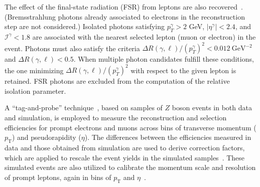 The effect of the final-state radiation (FSR) from leptons are also recovered~\cite{Sirunyan:2017ulk}. (Bremsstrahlung photons already associated to electrons in the reconstruction step are not considered.) Isolated photons satisfying $p_T^\gamma>2$ GeV, $|\eta^\gamma| <2.4$, and $\mathcal{I}^{\gamma} < 1.8$ are associated with the nearest selected lepton (muon or electron) in the event. Photons must also satisfy the criteria $\Delta R(\gamma,\ell)/(p_T^{\gamma})^2<0.012~\text{GeV}^{-2}$ and $\Delta R(\gamma,\ell) < 0.5$. When multiple photon candidates fulfill these conditions, the one minimizing $\Delta R(\gamma,\ell)/(p_T^{\gamma})^2$ with respect to the given lepton is retained. FSR photons are excluded from the computation of the relative isolation parameter.




A ``tag-and-probe'' technique~\cite{CMS:2011aa}, based on samples of $Z$ boson events in both data and simulation, is employed to measure the reconstruction and selection efficiencies for prompt electrons and muons across bins of transverse momentum ($p_{\mathrm{T}}$) and pseudorapidity ($\eta$). The differences between the efficiencies measured in data and those obtained from simulation are used to derive correction factors, which are applied to rescale the event yields in the simulated samples~\cite{Sirunyan:2021rug}. These simulated events are also utilized to calibrate the momentum scale and resolution of prompt leptons, again in bins of $p_{\mathrm{T}}$ and $\eta$~\cite{ScaleSmear2, Roch2}.


